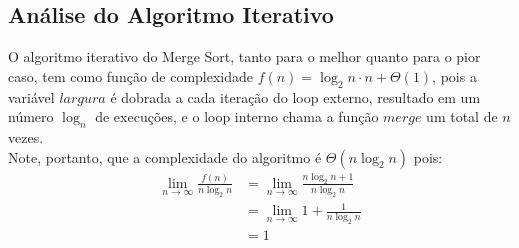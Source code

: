 \subsection{Análise do Algoritmo Iterativo}
O algoritmo iterativo do Merge Sort, tanto para o melhor quanto para o pior caso, tem como função de complexidade $f(n) = \log_2 n \cdot n + \Theta(1)$, pois a variável $largura$ é dobrada a cada iteração do loop externo, resultado em um número $\log_n$ de execuções, e o loop interno chama a função $merge$ um total de $n$ vezes. \\
Note, portanto, que a complexidade do algoritmo é $\Theta(n \log_2 n)$ pois:
\begin{align*}
  \lim_{n\to\infty} \frac{f(n)}{n\log_2 n} &= \lim_{n\to\infty} \frac{n \log_2 n + 1}{n\log_2 n} \\
  &= \lim_{n\to\infty} 1 + \frac{1}{n \log_2 n} \\
  &= 1
\end{align*}
